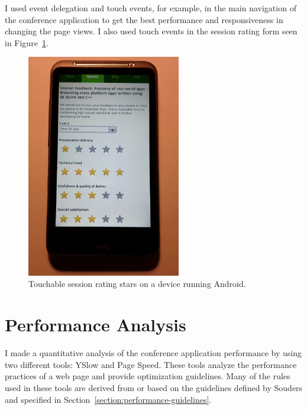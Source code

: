 I used event delegation and touch events, for example, in the main
navigation of the conference application to get the best performance
and responsiveness in changing the page views. I also used touch
events in the session rating form seen in
Figure~\ref{figure:android-feedback-stars.jpg}.

\begin{figure}[h!]
  \begin{center}
    \includegraphics[width=0.6\textwidth]{images/android-feedback-stars.jpg}
    \caption{Touchable session rating stars on a device running Android.}
    \label{figure:android-feedback-stars.jpg}
  \end{center}
\end{figure}

\section{Performance Analysis}
\label{section:performance-analysis}

I made a quantitative analysis of the conference application
performance by using two different tools: YSlow and Page Speed. These
tools analyze the performance practices of a web page and provide
optimization guidelines. Many of the rules used in these tools are
derived from or based on the guidelines defined by Souders
\cite{souders2007high, souders2009even} and specified in
Section~\ref{section:performance-guidelines}.

